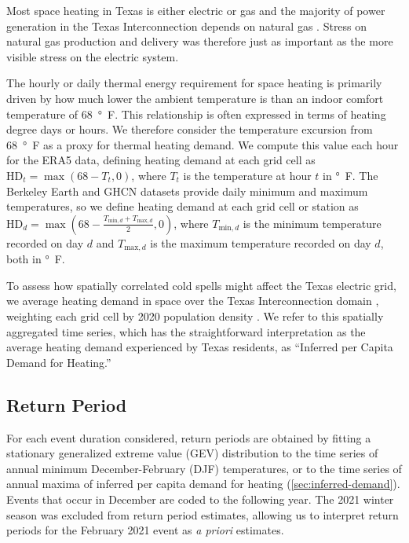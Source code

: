 \documentclass[12pt]{iopart}
\begin{document}
Most space heating in Texas is either electric or gas \cite{waite_heating:2020} and the majority of power generation in the Texas Interconnection depends on natural gas \cite{everhart_iea:2021}.
Stress on natural gas production and delivery was therefore just as important as the more visible stress on the electric system.

The hourly or daily thermal energy requirement for space heating is primarily driven by how much lower the ambient temperature is than an indoor comfort temperature of \SI{68}{\degree F}.
This relationship is often expressed in terms of heating degree days or hours.
We therefore consider the temperature excursion from \SI{68}{\degree F} as a proxy for thermal heating demand.
We compute this value each hour for the ERA5 data, defining heating demand at each grid cell as $\text{HD}_t = \max (68 - T_t, 0)$, where $T_t$ is the temperature at hour $t$ in \si{\degree F}.
The Berkeley Earth and GHCN datasets provide daily minimum and maximum temperatures, so we define heating demand at each grid cell or station as $\text{HD}_d = \max (68 -\frac{T_{\text{min},d} + T_{\text{max},d}}{2}, 0)$, where $T_{\text{min},d}$ is the minimum temperature recorded on day $d$ and $T_{\text{max},d}$ is the maximum temperature recorded on day $d$, both in \si{\degree F}.

To assess how spatially correlated cold spells might affect the Texas electric grid, we average heating demand in space over the Texas Interconnection domain \cite{useia_regions:2021}, weighting each grid cell by 2020 population density \cite{ciesin_gpwv4:2016}.
We refer to this spatially aggregated time series, which has the straightforward interpretation as the average heating demand experienced by Texas residents, as ``Inferred per Capita Demand for Heating.''

\subsection{Return Period}

For each event duration considered, return periods are obtained by fitting a stationary generalized extreme value (GEV) distribution to the time series of annual minimum December-February (DJF) temperatures, or to the time series of annual maxima of inferred per capita demand for heating (\cref{sec:inferred-demand}).
Events that occur in December are coded to the following year.
The 2021 winter season was excluded from return period estimates, allowing us to interpret return periods for the February 2021 event as \emph{a priori} estimates.
\end{document}
